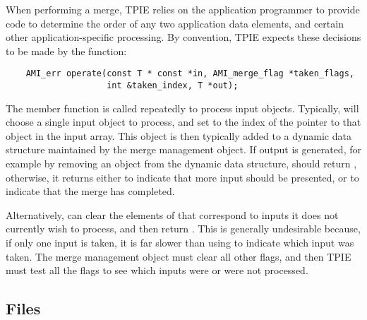     When performing a merge, TPIE relies on the application
    programmer to provide code to determine the order of any
    two application data elements, and certain other
    application-specific processing. By convention, TPIE
    expects these decisions to be made by the
     function:
\begin{verbatim}
    AMI_err operate(const T * const *in, AMI_merge_flag *taken_flags,
                    int &taken_index, T *out);
\end{verbatim}
    The  member function is called
    repeatedly to process input objects.  Typically,
     will choose a single input object to
    process, and set  to the index of
    the pointer to that object in the input array.  This
    object is then typically added to a dynamic data
    structure maintained by the merge management object.  If
    output is generated, for example by removing an object
    from the dynamic data structure, 
    should return , otherwise, it
    returns either  to indicate
    that more input should be presented, or
     to indicate that the merge has
    completed.
    
    Alternatively,  can clear the elements
    of  that correspond to inputs it
    does not currently wish to process, and then return
    .  This is generally
    undesirable because, if only one input is taken, it is
    far slower than using  to indicate
    which input was taken.  The merge management object must
    clear all other flags, and then TPIE must test all the
    flags to see which inputs were or were not processed.





\subsection{Files}
  \btabb
     {}
  \etabb

